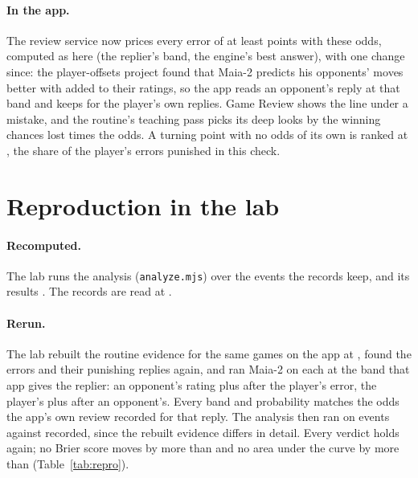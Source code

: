 \documentclass[11pt]{article}
\begin{document}
\paragraph{In the app.} The review service now prices every error of at least \ErrorAt{} points
with these odds, computed as here (the replier's band, the engine's best answer), with one change
since: the player-offsets project found that Maia-2 predicts his opponents' moves better with
\OpponentOffset{} added to their ratings, so the app reads an opponent's reply at that band and
keeps \PlayerOffset{} for the player's own replies. Game Review
shows the line under a mistake, and the routine's teaching pass picks its deep looks by the
winning chances lost times the odds. A turning point with no odds of its own is ranked at
\AppPrior, the share of the player's errors punished in this check.

\section{Reproduction in the lab}

\paragraph{Recomputed.} The lab runs the analysis (\texttt{analyze.mjs}) over the events the
records keep, and its results \RecomputedIdentical. The records are read at \RecordsCommit.

\paragraph{Rerun.} The lab rebuilt the routine evidence for the same games on the app at
\AppCommit, found the errors and their punishing replies again, and ran Maia-2 on each at the
band that app gives the replier: an opponent's rating plus \OpponentOffset{} after the player's
error, the player's plus \PlayerOffset{} after an opponent's. Every band and probability matches
the odds the app's own review recorded for that reply. The analysis then ran on \RerunEvents{}
events against \RecordedEvents{} recorded, since the rebuilt evidence differs in detail. Every
verdict holds again; no Brier score moves by more than
\RerunBrierMove{} and no area under the curve by more than \RerunAucMove{}
(Table~\ref{tab:repro}).

\begin{table}[!htbp]
\centering\small
\setlength{\tabcolsep}{4pt}
\ReproTable
\caption{The recorded analysis beside the rerun on rebuilt evidence. AUC is for E2 on errors of
at least \StepAt{} points.}
\label{tab:repro}
\end{table}
\end{document}
